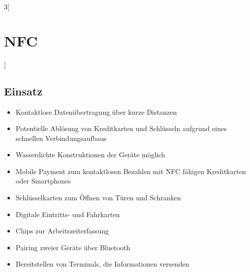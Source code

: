 \begin{multicols}{3}[\section{NFC}]
\subsection*{Einsatz}
\begin{itemize}
\item Kontaktlose Datenübertragung über kurze Distanzen
\item Potentielle Ablösung von Kreditkarten und Schlüsseln aufgrund eines schnellen Verbindungsaufbaus
\item Wasserdichte Konstruktionen der Geräte möglich
\item Mobile Payment zum kontaktlosen Bezahlen mit NFC fähigen Kreditkarten oder Smartphones
\item Schlüsselkarten zum Öffnen von Türen und Schranken
\item Digitale Eintritts- und Fahrkarten
\item Chips zur Arbeitszeiterfassung
\item Pairing zweier Geräte über Bluetooth
\item Bereitstellen von Terminals, die Informationen versenden~\cite{nfc.1,nfc.2,nfc.10}
\end{itemize}
\end{multicols}
\newpage

